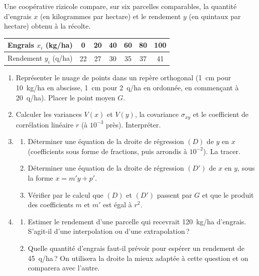       \begin{exo}
            \label{exo:stat7}
            Une coop\'erative rizicole compare, sur six parcelles comparables, la quantit\'e d'engrais $x$ 
            (en kilogrammes par hectare) et le rendement $y$ (en quintaux par hectare) obtenu \`a la r\'ecolte.
            \begin{center}
            \begin{tabular}{|c|c|c|c|c|c|c|}
                  \hline
                  Engrais $x_i$ (kg/ha) & 0 & 20 & 40 & 60 & 80 & 100 \\
                  \hline
                  Rendement $y_i$ (q/ha) & 22 & 27 & 30 & 35 & 37 & 41 \\
                  \hline
            \end{tabular}
            \end{center}
            \begin{enumerate}
                  \item Repr\'esenter le nuage de points dans un rep\`ere orthogonal 
                        (1~cm pour 10~kg/ha en abscisse, 1~cm pour 2~q/ha en ordonn\'ee, en commen\c{c}ant \`a 20~q/ha).
                        Placer le point moyen $G$.
                  \item Calculer les variances $V(x)$ et $V(y)$, la covariance $\sigma_{xy}$ et le coefficient de corr\'elation 
                        lin\'eaire $r$ (\`a $10^{-3}$ pr\`es). Interpr\'eter.
                  \item \begin{enumerate}
                        \item D\'eterminer une \'equation de la droite de r\'egression $(D)$ de $y$ en $x$ 
                              (coefficients sous forme de fractions, puis arrondis \`a $10^{-2}$). La tracer.
                        \item D\'eterminer une \'equation de la droite de r\'egression $(D')$ de $x$ en $y$, sous la forme $x = m' y + p'$.
                        \item V\'erifier par le calcul que $(D)$ et $(D')$ passent par $G$ et que le produit des coefficients
                              $m$ et $m'$ est \'egal \`a $r^2$.
                        \end{enumerate}
                  \item \begin{enumerate}
                        \item Estimer le rendement d'une parcelle qui recevrait 120~kg/ha d'engrais. 
                              S'agit-il d'une interpolation ou d'une extrapolation\,?
                        \item Quelle quantit\'e d'engrais faut-il pr\'evoir pour esp\'erer un rendement de 45~q/ha\,?
                              On utilisera la droite la mieux adapt\'ee \`a cette question et on comparera avec l'autre.
                        \end{enumerate}
            \end{enumerate}
      \end{exo}
